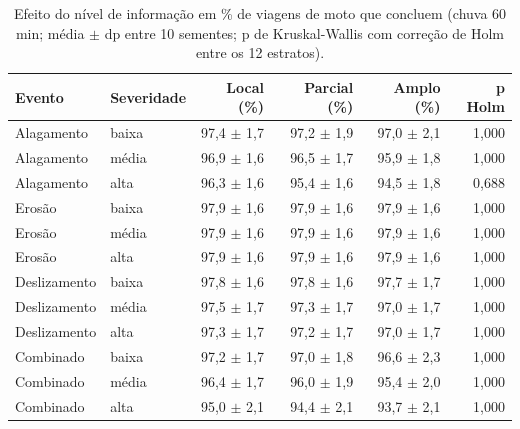 \begin{table}[htbp]
\centering
\scriptsize
\caption{Efeito do nível de informação em \% de viagens de moto que concluem (chuva 60 min; média $\pm$ dp entre 10 sementes; p de Kruskal-Wallis com correção de Holm entre os 12 estratos).}
\label{tab:t2_moto}
\begin{tabular}{llrrrr}
\toprule
Evento & Severidade & Local (\%) & Parcial (\%) & Amplo (\%) & p Holm \\
\midrule
Alagamento & baixa & 97,4 $\pm$ 1,7 & 97,2 $\pm$ 1,9 & 97,0 $\pm$ 2,1 & 1,000 \\
Alagamento & média & 96,9 $\pm$ 1,6 & 96,5 $\pm$ 1,7 & 95,9 $\pm$ 1,8 & 1,000 \\
Alagamento & alta & 96,3 $\pm$ 1,6 & 95,4 $\pm$ 1,6 & 94,5 $\pm$ 1,8 & 0,688 \\
Erosão & baixa & 97,9 $\pm$ 1,6 & 97,9 $\pm$ 1,6 & 97,9 $\pm$ 1,6 & 1,000 \\
Erosão & média & 97,9 $\pm$ 1,6 & 97,9 $\pm$ 1,6 & 97,9 $\pm$ 1,6 & 1,000 \\
Erosão & alta & 97,9 $\pm$ 1,6 & 97,9 $\pm$ 1,6 & 97,9 $\pm$ 1,6 & 1,000 \\
Deslizamento & baixa & 97,8 $\pm$ 1,6 & 97,8 $\pm$ 1,6 & 97,7 $\pm$ 1,7 & 1,000 \\
Deslizamento & média & 97,5 $\pm$ 1,7 & 97,3 $\pm$ 1,7 & 97,0 $\pm$ 1,7 & 1,000 \\
Deslizamento & alta & 97,3 $\pm$ 1,7 & 97,2 $\pm$ 1,7 & 97,0 $\pm$ 1,7 & 1,000 \\
Combinado & baixa & 97,2 $\pm$ 1,7 & 97,0 $\pm$ 1,8 & 96,6 $\pm$ 2,3 & 1,000 \\
Combinado & média & 96,4 $\pm$ 1,7 & 96,0 $\pm$ 1,9 & 95,4 $\pm$ 2,0 & 1,000 \\
Combinado & alta & 95,0 $\pm$ 2,1 & 94,4 $\pm$ 2,1 & 93,7 $\pm$ 2,1 & 1,000 \\
\bottomrule
\end{tabular}
\end{table}
